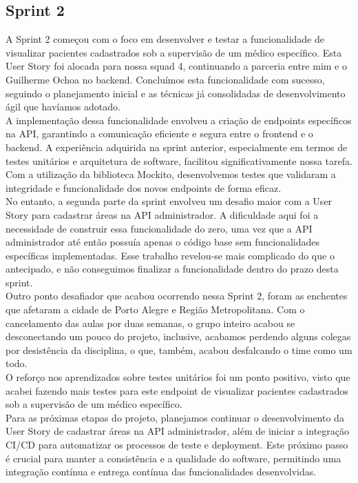 \subsection{Sprint 2}

A Sprint 2 começou com o foco em desenvolver e testar a funcionalidade de visualizar pacientes cadastrados sob a supervisão de um médico específico. Esta User Story foi alocada para nossa squad 4, continuando a parceria entre mim e o Guilherme Ochoa no backend. Concluímos esta funcionalidade com sucesso, seguindo o planejamento inicial e as técnicas já consolidadas de desenvolvimento ágil que havíamos adotado.\\

A implementação dessa funcionalidade envolveu a criação de endpoints específicos na API, garantindo a comunicação eficiente e segura entre o frontend e o backend. A experiência adquirida na sprint anterior, especialmente em termos de testes unitários e arquitetura de software, facilitou significativamente nossa tarefa. Com a utilização da biblioteca Mockito, desenvolvemos testes que validaram a integridade e funcionalidade dos novos endpoints de forma eficaz.\\
No entanto, a segunda parte da sprint envolveu um desafio maior com a User Story para cadastrar áreas na API administrador. A dificuldade aqui foi a necessidade de construir essa funcionalidade do zero, uma vez que a API administrador até então possuía apenas o código base sem funcionalidades específicas implementadas. Esse trabalho revelou-se mais complicado do que o antecipado, e não conseguimos finalizar a funcionalidade dentro do prazo desta sprint.\\

Outro ponto desafiador que acabou ocorrendo nessa Sprint 2, foram as enchentes que afetaram a cidade de Porto Alegre e Região Metropolitana. Com o cancelamento das aulas por duas semanas, o grupo inteiro acabou se desconectando um pouco do projeto, inclusive, acabamos perdendo alguns colegas por desistência da disciplina, o que, também, acabou desfalcando o time como um todo.\\
O reforço nos aprendizados sobre testes unitários foi um ponto positivo, visto que acabei fazendo mais testes para este endpoint de visualizar pacientes cadastrados sob a supervisão de um médico específico.\\

Para as próximas etapas do projeto, planejamos continuar o desenvolvimento da User Story de cadastrar áreas na API administrador, além de iniciar a integração CI/CD para automatizar os processos de teste e deployment. Este próximo passo é crucial para manter a consistência e a qualidade do software, permitindo uma integração contínua e entrega contínua das funcionalidades desenvolvidas.